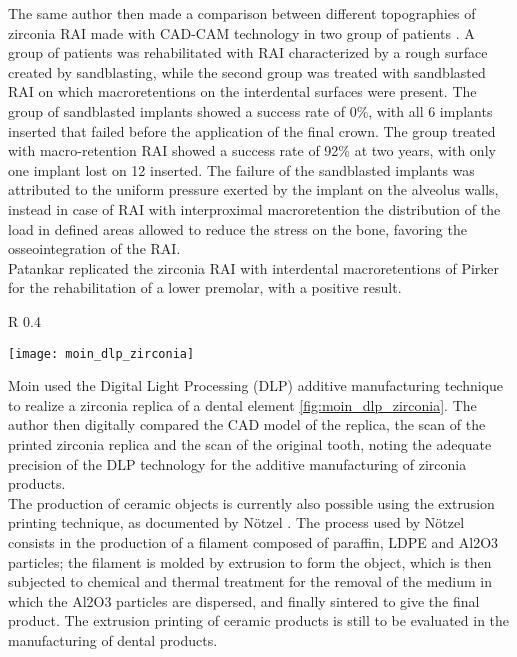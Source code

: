 The same author then made a comparison between different topographies of zirconia RAI made with CAD-CAM technology in two group of patients \parencite{Reference87}. A group of patients was rehabilitated with RAI characterized by a rough surface created by sandblasting, while the second group was treated with sandblasted RAI on which macroretentions on the interdental surfaces were present. The group of sandblasted implants showed a success rate of 0\%, with all 6 implants inserted that failed before the application of the final crown. The group treated with macro-retention RAI showed a success rate of 92\% at two years, with only one implant lost on 12 inserted. The failure of the sandblasted implants was attributed to the uniform pressure exerted by the implant on the alveolus walls, instead in case of RAI with interproximal macroretention the distribution of the load in defined areas allowed to reduce the stress on the bone, favoring the osseointegration of the RAI. \\
Patankar \parencite{Reference88} replicated the zirconia RAI with interdental macroretentions of Pirker for the rehabilitation of a lower premolar, with a positive result.

\begin{wrapfigure} {R} {0.4\textwidth}
\vspace{-20pt}
	\begin{center}
	\texttt{[image: moin\_dlp\_zirconia]}
    \caption{\textbf{Left}: CAD model of the tooth. \textbf{Right} DLP printend zirconia tooth. From \emph{Moin et al} \parencite{Reference89}}
    \label{fig:moin_dlp_zirconia}
    \end{center}
\vspace{-20pt}
\end{wrapfigure}

Moin \parencite{Reference89} used the Digital Light Processing (DLP) additive manufacturing technique to realize a zirconia replica of a dental element \ref{fig:moin_dlp_zirconia}. The author then digitally compared the CAD model of the replica, the scan of the printed zirconia replica and the scan of the original tooth, noting the adequate precision of the DLP technology for the additive manufacturing of zirconia products.\\
The production of ceramic objects is currently also possible using the extrusion printing technique, as documented by Nötzel \parencite{Reference97}. The process used by Nötzel consists in the production of a filament composed of paraffin, LDPE and Al2O3 particles; the filament is molded by extrusion to form the object, which is then subjected to chemical and thermal treatment for the removal of the medium in which the Al2O3 particles are dispersed, and finally sintered to give the final product. The extrusion printing of ceramic products is still to be evaluated in the manufacturing of dental products. \\

